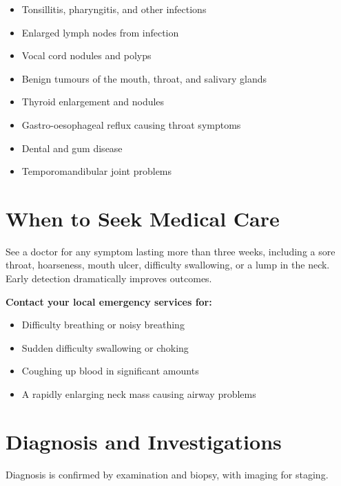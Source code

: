 \begin{itemize}
    \item Tonsillitis, pharyngitis, and other infections
    \item Enlarged lymph nodes from infection
    \item Vocal cord nodules and polyps
    \item Benign tumours of the mouth, throat, and salivary glands
    \item Thyroid enlargement and nodules
    \item Gastro-oesophageal reflux causing throat symptoms
    \item Dental and gum disease
    \item Temporomandibular joint problems
\end{itemize}

\section*{When to Seek Medical Care}
See a doctor for any symptom lasting more than three weeks, including a sore throat, hoarseness, mouth ulcer, difficulty swallowing, or a lump in the neck. Early detection dramatically improves outcomes.

\textbf{Contact your local emergency services for:}
\begin{itemize}
    \item Difficulty breathing or noisy breathing
    \item Sudden difficulty swallowing or choking
    \item Coughing up blood in significant amounts
    \item A rapidly enlarging neck mass causing airway problems
\end{itemize}

\section*{Diagnosis and Investigations}
Diagnosis is confirmed by examination and biopsy, with imaging for staging.

